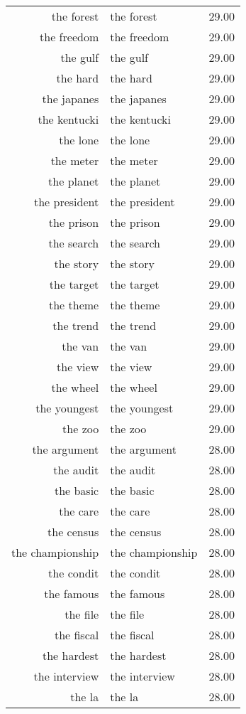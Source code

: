 \begin{table}[ht]
\begin{tabular}{rlr}
  the forest & the forest & 29.00 \\ 
  the freedom & the freedom & 29.00 \\ 
  the gulf & the gulf & 29.00 \\ 
  the hard & the hard & 29.00 \\ 
  the japanes & the japanes & 29.00 \\ 
  the kentucki & the kentucki & 29.00 \\ 
  the lone & the lone & 29.00 \\ 
  the meter & the meter & 29.00 \\ 
  the planet & the planet & 29.00 \\ 
  the president & the president & 29.00 \\ 
  the prison & the prison & 29.00 \\ 
  the search & the search & 29.00 \\ 
  the story & the story & 29.00 \\ 
  the target & the target & 29.00 \\ 
  the theme & the theme & 29.00 \\ 
  the trend & the trend & 29.00 \\ 
  the van & the van & 29.00 \\ 
  the view & the view & 29.00 \\ 
  the wheel & the wheel & 29.00 \\ 
  the youngest & the youngest & 29.00 \\ 
  the zoo & the zoo & 29.00 \\ 
  the argument & the argument & 28.00 \\ 
  the audit & the audit & 28.00 \\ 
  the basic & the basic & 28.00 \\ 
  the care & the care & 28.00 \\ 
  the census & the census & 28.00 \\ 
  the championship & the championship & 28.00 \\ 
  the condit & the condit & 28.00 \\ 
  the famous & the famous & 28.00 \\ 
  the file & the file & 28.00 \\ 
  the fiscal & the fiscal & 28.00 \\ 
  the hardest & the hardest & 28.00 \\ 
  the interview & the interview & 28.00 \\ 
  the la & the la & 28.00 \\ 

\end{tabular}
\end{table}
